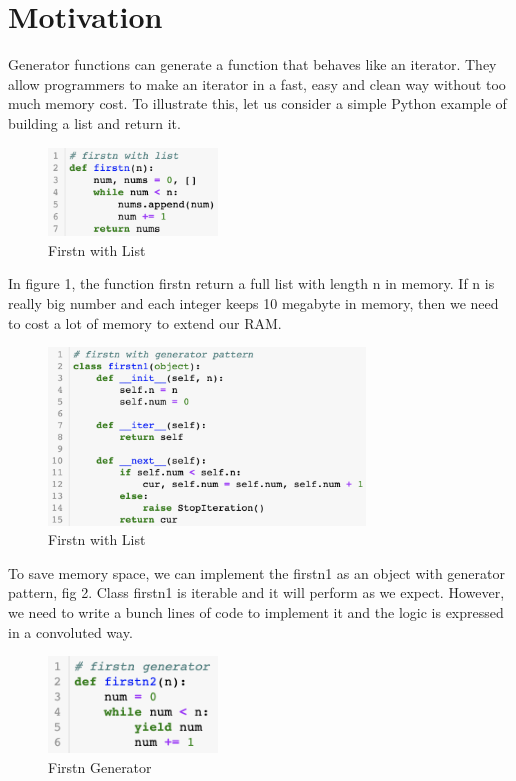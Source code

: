 
\section{Motivation}
Generator functions can generate a function that behaves like an iterator. They allow programmers to make an iterator in a fast, easy and clean way without too much memory cost. To illustrate this, let us consider a simple Python example of building a list and return it\cite{generators}.
%
\begin{figure}[H]
	\centering
	\includegraphics[width=0.4\textwidth]{figures/fstn}
	\caption{Firstn with List}
\end{figure}
%
In figure 1, the function firstn return a full list with length n in memory. If n is really big number and each integer keeps 10 megabyte in memory, then we need to cost a lot of memory to extend our RAM.
%
\begin{figure}[H]
	\centering
	\includegraphics[width=0.75\textwidth]{figures/fstn1}
	\caption{Firstn with List}
\end{figure}
%
To save memory space, we can implement the firstn1 as an object with generator pattern, fig 2. Class firstn1 is iterable and it will perform as we expect. However, we need to write a bunch lines of code to implement it and the logic is expressed in a convoluted way.

%
\begin{figure}[H]
	\centering
	\includegraphics[width=0.4\textwidth]{figures/fstn2}
	\caption{Firstn Generator}
\end{figure}
%

